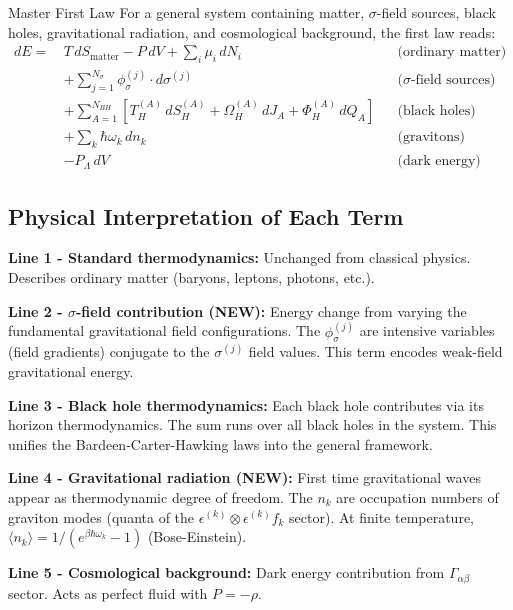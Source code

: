 \documentclass[11pt,a4paper]{article}
\theoremstyle{definition}
\theoremstyle{remark}
\begin{document}
	Master First Law
		For a general system containing matter, $\sigma$-field sources, black holes, gravitational radiation, and cosmological background, the first law reads:
		\begin{equation}
			\boxed{
				\begin{aligned}
					dE = \,&T\,dS_{\text{matter}} - P\,dV + \sum_i \mu_i\,dN_i && \text{(ordinary matter)}\\
					&+ \sum_{j=1}^{N_\sigma} \phi_\sigma^{(j)} \cdot d\sigma^{(j)} && \text{($\sigma$-field sources)}\\
					&+ \sum_{A=1}^{N_{BH}} \left[T_H^{(A)}\,dS_H^{(A)} + \Omega_H^{(A)}\,dJ_A + \Phi_H^{(A)}\,dQ_A\right] && \text{(black holes)}\\
					&+ \sum_k \hbar\omega_k\,dn_k && \text{(gravitons)}\\
					&- P_\Lambda\,dV && \text{(dark energy)}
				\end{aligned}
			}
		\end{equation}
	
	\subsection{Physical Interpretation of Each Term}
	
	\textbf{Line 1 - Standard thermodynamics:}
	Unchanged from classical physics. Describes ordinary matter (baryons, leptons, photons, etc.).
	
	\textbf{Line 2 - $\sigma$-field contribution (NEW):}
	Energy change from varying the fundamental gravitational field configurations. The $\phi_\sigma^{(j)}$ are intensive variables (field gradients) conjugate to the $\sigma^{(j)}$ field values. This term encodes weak-field gravitational energy.
	
	\textbf{Line 3 - Black hole thermodynamics:}
	Each black hole contributes via its horizon thermodynamics. The sum runs over all black holes in the system. This unifies the Bardeen-Carter-Hawking laws into the general framework.
	
	\textbf{Line 4 - Gravitational radiation (NEW):}
	First time gravitational waves appear as thermodynamic degree of freedom. The $n_k$ are occupation numbers of graviton modes (quanta of the $\epsilon^{(k)}\otimes\epsilon^{(k)} f_k$ sector). At finite temperature, $\langle n_k \rangle = 1/(e^{\beta\hbar\omega_k} - 1)$ (Bose-Einstein).
	
	\textbf{Line 5 - Cosmological background:}
	Dark energy contribution from $\Gamma_{\alpha\beta}$ sector. Acts as perfect fluid with $P = -\rho$.
	
\end{document}
